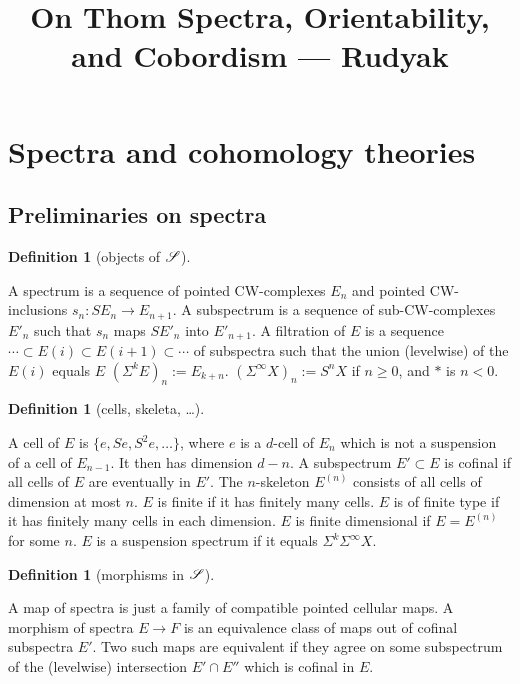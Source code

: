 \documentclass[11pt]{article}
\title{On Thom Spectra, Orientability, and Cobordism\small{ --- Rudyak}}
\newcommand{\VIEWtheWHOLEdocument}{} %
\renewcommand{\comment}{}
\theoremstyle{plain}
\theoremstyle{definition}
\newtheorem{defn}[thm]{Definition}
\begin{document}
\ifx\VIEWtheWHOLEdocument\undefined
\else
\tableofcontents
\fi

\setcounter{section}{1}
\section{Spectra and \lparen co\rparen homology theories}
\subsection{Preliminaries on spectra}
\comment{
\begin{defn}[objects of $\mathscr{S}$]\hfil
\begin{itemise}
\itm[(a)]A spectrum is a sequence of pointed CW-complexes $E_n$ and pointed
CW-inclusions $s_n:SE_n\to E_{n+1}$.
\itm[(b)]A subspectrum is a sequence of sub-CW-complexes $E'_n$ such that $s_n$
maps $SE'_n$ into $E'_{n+1}$.
\itm[(c)]A filtration of $E$ is a sequence 
$\cdots\subset E(i)\subset E(i+1)\subset\cdots$ of subspectra such that the
union (levelwise) of the $E(i)$ equals $E$
\itm[(d)]$(\Sigma^kE)_n:=E_{k+n}$.
\itm[(e)]$(\Sigma^\infty X)_n:=S^nX$ if $n\geq0$, and $*$ is $n<0$.
\end{itemise}
\end{defn}
\begin{defn}[cells, skeleta, \ldots]\hfil
\begin{itemise}
\itm[(a)]
A cell of $E$ is $\{e,Se,S^2e,\ldots\}$, where $e$ is a $d$-cell of $E_n$ which
is not a suspension of a cell of $E_{n-1}$. It then has dimension $d-n$.
\itm[(b)]A subspectrum $E'\subset E$ is cofinal if all cells of $E$ are
eventually in $E'$.
\itm[(c)]The $n$-skeleton $E^{(n)}$ consists of all cells of dimension at most
$n$.
\itm[(d)]$E$ is finite if it has finitely many cells.
\itm[(e)]$E$ is of finite type if it has finitely many cells in each dimension.
\itm[(f)]$E$ is finite dimensional if $E=E^{(n)}$ for some $n$.
\itm[(g)]$E$ is a suspension spectrum if it equals $\Sigma^k\Sigma^\infty X$.
\end{itemise}
\end{defn}
\begin{defn}[morphisms in $\mathscr{S}$]\hfil
\begin{itemise}
\itm[(a)]A map of spectra is just a family of compatible pointed cellular maps.
\itm[(b)]A morphism of spectra $E\to F$ is an equivalence class of maps out of
cofinal subspectra $E'$. Two such maps are equivalent if they agree on some
subspectrum of the (levelwise) intersection $E'\cap E''$ which is cofinal in
$E$.
\end{itemise}

\end{defn}}
\end{document}
